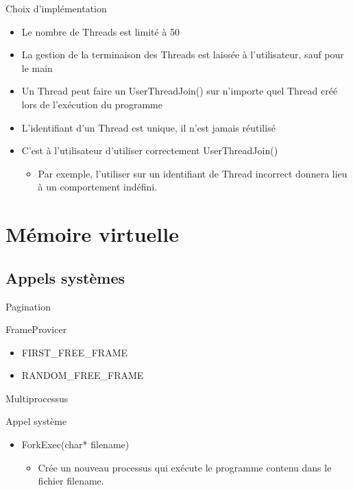 \documentclass{beamer}
\begin{document}
\begin{frame}
	\begin{block}{Choix d’implémentation }
		\begin{itemize}[<+->]
			\item Le nombre de Threads est limité à 50 
			\item La gestion de la terminaison des Threads est laissée à l'utilisateur, sauf pour le main
			\item Un Thread peut faire un UserThreadJoin() sur n'importe quel Thread créé lors de l'exécution du programme
			\item L'identifiant d'un Thread est unique, il n'est jamais réutilisé
			\item C'est à l'utilisateur d'utiliser correctement UserThreadJoin() 
			\begin{itemize}
				\item Par exemple, l'utiliser sur un identifiant de Thread incorrect donnera lieu à un comportement indéfini.
			\end{itemize}			
		\end{itemize}
	\end{block}
\end{frame}

\section{Mémoire virtuelle}
\subsection{Appels systèmes}
\begin{frame}{Pagination}
	\begin{block}{FrameProvicer}
		\begin{itemize}[<+->]
			\item FIRST\_FREE\_FRAME
			\item RANDOM\_FREE\_FRAME
		\end{itemize}
	\end{block}
\end{frame}
\begin{frame}{Multiprocessus}
	\begin{block}{Appel système}
		\begin{itemize}[<+->]
			\item ForkExec(char* filename)
			\begin{itemize}
				\item<1-> Crée un nouveau processus qui exécute le programme contenu dans le fichier filename.
			\end{itemize}
		\end{itemize}
	\end{block}
\end{frame}
\end{document}
